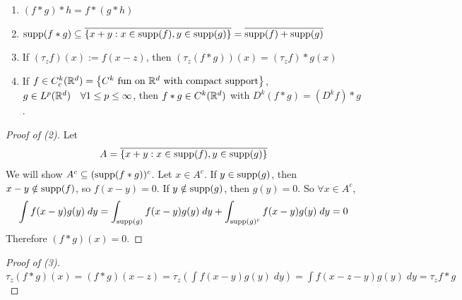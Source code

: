 \begin{prop}
    \begin{enumerate}
        \item $(f*g) * h = f * (g * h)$
        \item $\operatorname{supp}(f * g) \subseteq \overline{\left\{ x + y : x \in \operatorname{supp}(f), y \in \operatorname{supp}(g) \right\} } = \overline{\operatorname{supp}(f) + \operatorname{supp}(g)}$
        \item If $(\tau_z f)(x) := f(x-z)$, then $(\tau_z (f * g))(x) = (\tau_z f) * g(x)$ 
        \item If $f \in C_c^k(\mathbb{R}^d) = \left\{ C^k \text{ fun on } \mathbb{R}^d \text{ with compact support} \right\}$, $g \in L^p(\mathbb{R}^d) \quad
        \forall 1 \leq p \leq \infty$, then $f * g \in C^k(\mathbb{R}^d)$ with $D^k(f*g) = (D^k f) * g$.   
    \end{enumerate}
\end{prop}
\begin{proof}[Proof of (2)]
    Let
    \[
        A = \overline{\left\{ x + y : x \in \operatorname{supp}(f), y \in \operatorname{supp}(g) \right\} }
    \]  
    We will show $A^c \subseteq (\operatorname{supp}(f*g))^c$. Let $x \in A^c$. 
    If $y \in \operatorname{supp}(g)$, then $x- y \notin \operatorname{supp}(f)$, so $f(x- y) = 0$. If $y \notin \operatorname{supp}(g)$, 
    then $g(y) = 0$. So $\forall x \in A^c$,
    \[
        \int f(x-y) g(y) \; dy = \int_{\operatorname{supp}(g)} f(x-y) g(y) \; dy + \int_{\operatorname{supp}(g)^c} f(x-y) g(y) \; dy = 0
    \]      
    Therefore $(f*g)(x) = 0$. \qedhere 
\end{proof}

\begin{proof}[Proof of (3)]
    $\tau_z(f*g)(x) = (f*g)(x-z) = \tau_z (\int f(x-y) g(y) \; dy) = \int f(x - z - y) g(y) \; dy = \tau_z f * g$ \qedhere
\end{proof}

